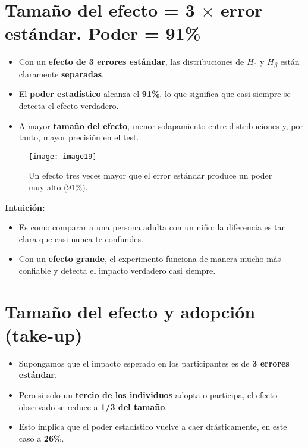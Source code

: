\documentclass[12pt]{article}
\begin{document}
\section*{\noindent\textbf{Tamaño del efecto = 3 $\times$ error estándar. Poder = 91\%}}

\begin{itemize}
    \item Con un \textbf{efecto de 3 errores estándar}, las distribuciones de $H_0$ y $H_\beta$ están claramente \textbf{separadas}.
    \item El \textbf{poder estadístico} alcanza el \textbf{91\%}, lo que significa que casi siempre se detecta el efecto verdadero.
    \item A mayor \textbf{tamaño del efecto}, menor solapamiento entre distribuciones y, por tanto, mayor precisión en el test.
\end{itemize}

\begin{figure}[H]
    \centering
    \texttt{[image: image19]}
    \caption{\footnotesize Un efecto tres veces mayor que el error estándar produce un poder muy alto (91\%).}
\end{figure}

\textbf{Intuición:}
\begin{itemize}
    \item Es como comparar a una persona adulta con un niño: la diferencia es tan clara que casi nunca te confundes.
    \item Con un \textbf{efecto grande}, el experimento funciona de manera mucho más confiable y detecta el impacto verdadero casi siempre.
\end{itemize}

\section*{\noindent\textbf{Tamaño del efecto y adopción (take-up)}}

\begin{itemize}
    \item Supongamos que el impacto esperado en los participantes es de \textbf{3 errores estándar}.
    \item Pero si solo un \textbf{tercio de los individuos} adopta o participa, el efecto observado se reduce a \textbf{1/3 del tamaño}.
    \item Esto implica que el poder estadístico vuelve a caer drásticamente, en este caso a \textbf{26\%}.
\end{itemize}
\end{document}
